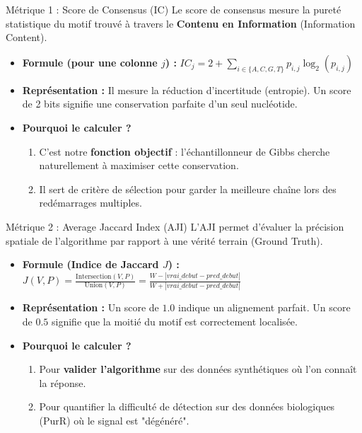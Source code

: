 \documentclass[10pt]{beamer}
\begin{document}
\begin{frame}{Métrique 1 : Score de Consensus (IC)}
    Le score de consensus mesure la pureté statistique du motif trouvé à travers le \textbf{Contenu en Information} (Information Content).
    \begin{itemize}
        \item \textbf{Formule (pour une colonne $j$) :}
        $IC_j = 2 + \sum_{i \in \{A,C,G,T\}} p_{i,j} \log_2(p_{i,j})$
        \item \textbf{Représentation :} Il mesure la réduction d'incertitude (entropie). Un score de 2 bits signifie une conservation parfaite d'un seul nucléotide.
        \item \textbf{Pourquoi le calculer ?} 
        \begin{enumerate}
            \item C'est notre \textbf{fonction objectif} : l'échantillonneur de Gibbs cherche naturellement à maximiser cette conservation.
            \item Il sert de critère de sélection pour garder la meilleure chaîne lors des redémarrages multiples.
        \end{enumerate}
    \end{itemize}
\end{frame}

\begin{frame}{Métrique 2 : Average Jaccard Index (AJI)}
    L'AJI permet d'évaluer la précision spatiale de l'algorithme par rapport à une vérité terrain (Ground Truth).
    \begin{itemize}
        \item \textbf{Formule (Indice de Jaccard $J$) :}
        $J(V, P) = \frac{\text{Intersection}(V, P)}{\text{Union}(V, P)} = \frac{W - |vrai\_debut - pred\_debut|}{W + |vrai\_debut - pred\_debut|}$
        \item \textbf{Représentation :} Un score de $1.0$ indique un alignement parfait. Un score de $0.5$ signifie que la moitié du motif est correctement localisée.
        \item \textbf{Pourquoi le calculer ?} 
        \begin{enumerate}
            \item Pour \textbf{valider l'algorithme} sur des données synthétiques où l'on connaît la réponse.
            \item Pour quantifier la difficulté de détection sur des données biologiques (PurR) où le signal est "dégénéré".
        \end{enumerate}
    \end{itemize}
\end{frame}
\end{document}
